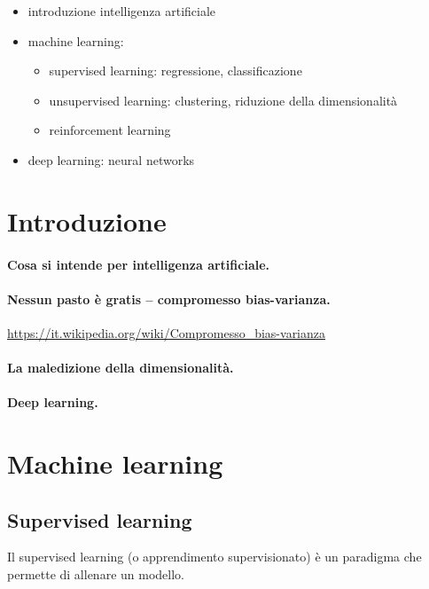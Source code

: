 
\begin{itemize}
  \item introduzione intelligenza artificiale
  \item machine learning:
  \begin{itemize}
    \item supervised learning: regressione, classificazione
    \item unsupervised learning: clustering, riduzione della dimensionalità
    \item reinforcement learning
  \end{itemize}
  \item deep learning: neural networks
\end{itemize}

\section{Introduzione}
\paragraph{Cosa si intende per intelligenza artificiale.}
\paragraph{Nessun pasto è gratis -- compromesso bias-varianza.}
\href{https://it.wikipedia.org/wiki/Compromesso_bias-varianza}{https://it.wikipedia.org/wiki/Compromesso\_bias-varianza}
\paragraph{La maledizione della dimensionalità.}
\paragraph{Deep learning.}

\section{Machine learning}


\subsection{Supervised learning}
Il supervised learning (o apprendimento supervisionato) è un paradigma che permette di allenare un modello.

